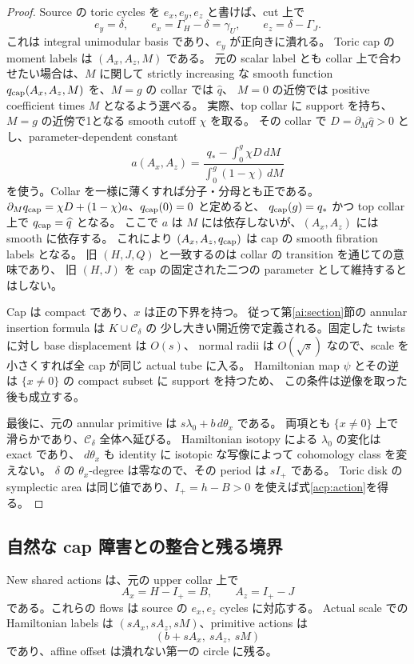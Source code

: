 \begin{proof}
Source の toric cycles を $e_x,e_y,e_z$ と書けば、cut 上で
\[
 e_y=\delta,\qquad e_x=\Gamma_H-\delta=\gamma_U,
 \qquad e_z=\delta-\Gamma_J.
\]
これは integral unimodular basis であり、$e_y$ が正向きに潰れる。
Toric cap の moment labels は $(A_x,A_z,M)$ である。
元の scalar label とも collar 上で合わせたい場合は、$M$ に関して strictly increasing な
smooth function $q_{\rm cap}(A_x,A_z,M)$ を、$M=g$ の collar では $\widehat q$、
$M=0$ の近傍では positive coefficient times $M$ となるよう選べる。
実際、top collar に support を持ち、$M=g$ の近傍で1となる smooth cutoff $\chi$ を取る。
その collar で $D=\partial_M\widehat q>0$ とし、parameter-dependent constant
\[
 a(A_x,A_z)=
 \frac{q_*-\int_0^g\chi D\,dM}{\int_0^g(1-\chi)\,dM}
\]
を使う。Collar を一様に薄くすれば分子・分母とも正である。
$\partial_Mq_{\rm cap}=\chi D+(1-\chi)a$、$q_{\rm cap}(0)=0$ と定めると、
$q_{\rm cap}(g)=q_*$ かつ top collar 上で $q_{\rm cap}=\widehat q$ となる。
ここで $a$ は $M$ には依存しないが、$(A_x,A_z)$ には smooth に依存する。
これにより $(A_x,A_z,q_{\rm cap})$ は cap の smooth fibration labels となる。
旧 $(H,J,Q)$ と一致するのは collar の transition を通じての意味であり、
旧 $(H,J)$ を cap の固定された二つの parameter として維持するとはしない。

Cap は compact であり、$x$ は正の下界を持つ。
従って第\ref{ai:section}節の annular insertion formula は $K\cup\mathcal C_\delta$ の
少し大きい開近傍で定義される。固定した twists に対し base displacement は $O(s)$、
normal radii は $O(\sqrt s)$ なので、scale を小さくすれば全 cap が同じ actual tube に入る。
Hamiltonian map $\psi$ とその逆は $\{x\ne0\}$ の compact subset に support を持つため、
この条件は逆像を取った後も成立する。

最後に、元の annular primitive は $s\lambda_0+b\,d\theta_x$ である。
両項とも $\{x\ne0\}$ 上で滑らかであり、$\mathcal C_\delta$ 全体へ延びる。
Hamiltonian isotopy による $\lambda_0$ の変化は exact であり、
$d\theta_x$ も identity に isotopic な写像によって cohomology class を変えない。
$\delta$ の $\theta_x$-degree は零なので、その period は $sI_+$ である。
Toric disk の symplectic area は同じ値であり、$I_+=h-B>0$ を使えば式\eqref{acp:action}を得る。
\end{proof}

\subsection{自然な cap 障害との整合と残る境界}

New shared actions は、元の upper collar 上で
\begin{equation}\label{acp:new-shared}
 A_x=H-I_+=B,\qquad A_z=I_+-J
\end{equation}
である。これらの flows は source の $e_x,e_z$ cycles に対応する。
Actual scale での Hamiltonian labels は $(sA_x,sA_z,sM)$、primitive actions は
\[
 (b+sA_x,\ sA_z,\ sM)
\]
であり、affine offset は潰れない第一の circle に残る。

